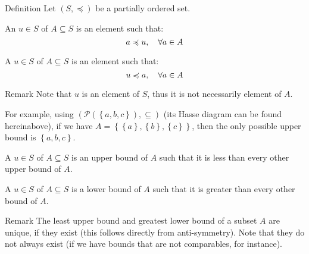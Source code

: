 \documentclass[a4paper]{article}
\begin{document}
\begin{parag}{Definition}
    Let $\left(S, \preccurlyeq\right)$ be a partially ordered set.

    An  $u \in S$ of $A \subseteq S$ is an element such that:
    \[a \preccurlyeq u, \quad \forall a \in A\]

    A  $u \in S$ of $A \subseteq S$ is an element such that:
    \[u \preccurlyeq a, \quad \forall a \in A\]

    \begin{subparag}{Remark}
        Note that $u$ is an element of $S$, thus it is not necessarily element of $A$.

        For example, using $\left(\mathcal{P}\left(\left\{a, b, c\right\}\right), \subseteq\right)$ (its Hasse diagram can be found hereinabove), if we have $A = \left\{\left\{a\right\}, \left\{b\right\}, \left\{c\right\}\right\}$, then the only possible upper bound is $\left\{a,b,c\right\}$.
    \end{subparag}

    A  $u \in S$ of $A \subseteq S$ is an upper bound of $A$ such that it is less than every other upper bound of $A$.

    A  $u \in S$ of $A \subseteq S$ is a lower bound of $A$ such that it is greater than every other bound of $A$.

    \begin{subparag}{Remark}
        The least upper bound and greatest lower bound of a subset $A$ are unique, if they exist (this follows directly from anti-symmetry). Note that they do not always exist (if we have bounds that are not comparables, for instance).
    \end{subparag}
\end{parag}
\end{document}
